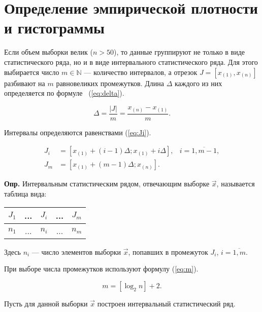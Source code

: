 \section{Определение эмпирической плотности и гистограммы}

Если объем выборки велик ($n > 50$), то данные группируют не только в виде статистического ряда, но и в виде интервального статистического ряда. 
Для этого выбирается число $m \in \mathbb{N}$ --- количество интервалов, а отрезок $J=[x_{(1)}, x_{(n)}]$ разбивают на $m$ равновеликих промежутков. 
Длина $\Delta$ каждого из них определяется по формуле ~(\ref{eq:delta}).

\begin{equation}\label{eq:delta}
	\Delta = \frac{|J|}{m} = \frac{x_{(n)} - x_{(1)}}{m}.
\end{equation}

Интервалы определяются равенствами (\ref{eq:Ji}).

\begin{equation}
	\label{eq:Ji}
	\begin{aligned}
		J_i &= [x_{(1)} + (i - 1) \Delta; x_{(1)} + i \Delta],
		& i = \overline{1, m-1},\\
		J_m &= [x_{(1)} + (m - 1) \Delta; x_{(n)}].
	\end{aligned}
\end{equation}

\textbf{Опр.} Интервальным статистическим рядом, отвечающим
выборке $\vec{x}$, называется таблица вида:

\begin{table}[htb]
	\centering
	\begin{tabular}{|c|c|c|c|c|}
		\hline
		$J_1$ & ... & $J_i$ & ... & $J_m$ \\
		\hline
		$n_1$ & ... & $n_i$ & ... & $n_m$ \\
		\hline
	\end{tabular}
\end{table}

Здесь $n_i$ --- число элементов выборки $\vec{x}$, попавших в промежуток $J_i$, $i= \overline{1,m}$.

При выборе числа промежутков используют формулу (\ref{eq:m}).

\begin{equation}\label{eq:m}
	m = [\log_2 n] + 2.
\end{equation}

Пусть для данной выборки $\vec{x}$ построен интервальный статистический ряд.

